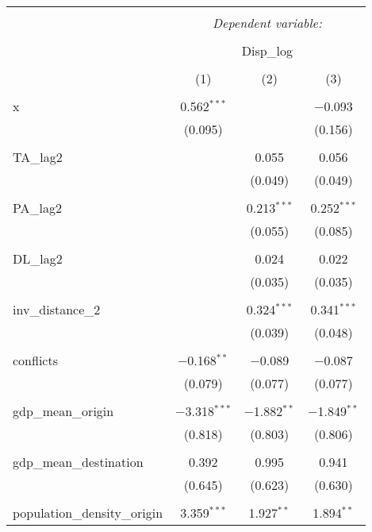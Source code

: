 
\begin{table}[!htbp] \centering 
  \caption{} 
  \label{} 
\begin{tabular}{@{\extracolsep{5pt}}lccc} 
\\[-1.8ex]\hline 
\hline \\[-1.8ex] 
 & \multicolumn{3}{c}{\textit{Dependent variable:}} \\ 
\cline{2-4} 
\\[-1.8ex] & \multicolumn{3}{c}{Disp\_log} \\ 
\\[-1.8ex] & (1) & (2) & (3)\\ 
\hline \\[-1.8ex] 
 x & 0.562$^{***}$ &  & $-$0.093 \\ 
  & (0.095) &  & (0.156) \\ 
  & & & \\ 
 TA\_lag2 &  & 0.055 & 0.056 \\ 
  &  & (0.049) & (0.049) \\ 
  & & & \\ 
 PA\_lag2 &  & 0.213$^{***}$ & 0.252$^{***}$ \\ 
  &  & (0.055) & (0.085) \\ 
  & & & \\ 
 DL\_lag2 &  & 0.024 & 0.022 \\ 
  &  & (0.035) & (0.035) \\ 
  & & & \\ 
 inv\_distance\_2 &  & 0.324$^{***}$ & 0.341$^{***}$ \\ 
  &  & (0.039) & (0.048) \\ 
  & & & \\ 
 conflicts & $-$0.168$^{**}$ & $-$0.089 & $-$0.087 \\ 
  & (0.079) & (0.077) & (0.077) \\ 
  & & & \\ 
 gdp\_mean\_origin & $-$3.318$^{***}$ & $-$1.882$^{**}$ & $-$1.849$^{**}$ \\ 
  & (0.818) & (0.803) & (0.806) \\ 
  & & & \\ 
 gdp\_mean\_destination & 0.392 & 0.995 & 0.941 \\ 
  & (0.645) & (0.623) & (0.630) \\ 
  & & & \\ 
 population\_density\_origin & 3.359$^{***}$ & 1.927$^{**}$ & 1.894$^{**}$ \\ 

\end{tabular}
\end{table}
